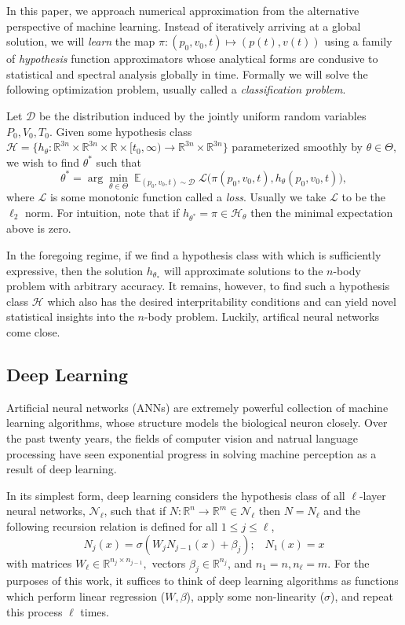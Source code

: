 \documentclass{article}
\numberwithin{theorem}{section}
\numberwithin{equation}{section}
\def\scripth{{\mathcal H}}
\def\scriptd{{\mathcal D}}
\def\scriptl{{\mathcal L}}
\def\scriptn{{\mathcal N}}
\begin{document}
 In this paper, we approach numerical approximation from the alternative perspective of machine learning. Instead of iteratively arriving at a global solution, we will \emph{learn} the map $\pi: (p_0, v_0, t) \mapsto (p(t), v(t))$ using a family of \emph{hypothesis} function approximators whose analytical forms are condusive to statistical and spectral analysis globally in time.  Formally we will solve the following optimization problem, usually called a \emph{classification problem}.

 Let $\scriptd$ be the distribution induced by the jointly uniform random variables $P_0, V_0, T_0$. Given some hypothesis class $\scripth = \{h_\theta: \mathbb{R}^{3n} \times \mathbb{R}^{3n} \times \mathbb{R}
\times  [t_0, \infty)  \to  \mathbb{R}^{3n} \times \mathbb{R}^{3n} \}$ parameterized smoothly by $\theta \in \Theta,$ we wish to find $\theta^*$ such that
 \begin{equation}\label{eq:learning}
 	\theta^* = \arg\min_{\theta \in \Theta} \mathop{\mathbb{E}}_{(p_0, v_0, t) \sim \scriptd}\scriptl \Big( \pi(p_0,v_0,t), h_\theta(p_0, v_0, t)\Big),
 \end{equation}
 where $\scriptl$ is some monotonic function called a \emph{loss}. Usually we take $ \scriptl$ to be the $\ell_2$ norm.
 For intuition, note that if $h_{\theta^{*}} = \pi \in \scripth_\theta$ then the minimal expectation above is zero.

 In the foregoing regime, if we find a hypothesis class with which is sufficiently expressive, then the solution $h_{\theta_*}$ will approximate solutions to the $n$-body problem with arbitrary accuracy. It remains, however, to find such a hypothesis class $\scripth$ which also has the desired interpritability conditions and can yield novel statistical insights into the $n$-body problem. Luckily, artifical neural networks come close.

 \subsection{Deep Learning} \label{sec:dl}  Artificial neural networks (ANNs) are extremely powerful collection of machine learning algorithms, whose structure models the biological neuron closely. Over the past twenty years, the fields of computer vision and natrual language processing have seen exponential progress in solving machine perception as a result of deep learning. 

In its simplest form, deep learning considers the hypothesis class of all $\ell$-layer neural networks, $\scriptn_\ell$, such that
if $N: \mathbb{R}^n \to \mathbb{R}^m \in \scriptn_\ell$ then $N = N_\ell$ and the following recursion relation is defined for all $1 \leq j \leq \ell$,
\begin{equation}
	N_j(x) = \sigma\left(W_j N_{j -1}(x) + \beta_j\right);\;\;\;N_1(x) = x
\end{equation}
with matrices $W_\ell \in \mathbb{R}^{ n_{j} \times n_{j-1}},$ vectors $\beta_j \in \mathbb{R}^{n_j}$, and $n_1 = n, n_\ell = m.$ For the purposes of this work, it suffices to think of deep learning algorithms as functions which perform linear regression ($W, \beta$), apply some non-linearity ($\sigma$), and repeat this process $\ell$ times. 
\end{document}

